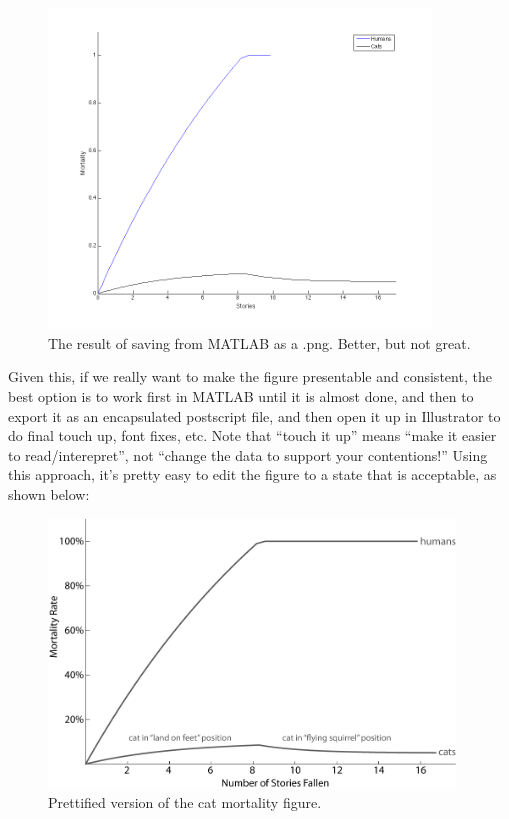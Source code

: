 \documentclass{tufte-handout}
\begin{document}
\begin{figure}[h!]
\includegraphics[width=4in]{figs/LessUglyCatFigure}
\caption{The result of saving from MATLAB as a .png.  Better, but not great.}
\end{figure} 



Given this, if we really want to make the figure presentable and consistent, the best option is to work first in MATLAB until it is almost done, and then to export it as an encapsulated postscript file, and then open it up in Illustrator to do final touch up, font fixes, etc.  Note that ``touch it up'' means ``make it easier to read/interepret'',  not ``change the data to support your contentions!''  Using this approach, it's pretty easy to edit the figure to a state that is acceptable, as shown below:

 \begin{figure}[h!]
\includegraphics[width=4.25in]{figs/CatMortalityPrettified}
\caption{Prettified version of the cat mortality figure.}
\end{figure}
 
\end{document}
